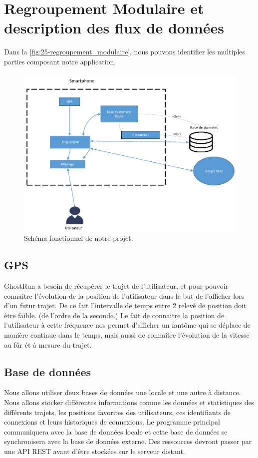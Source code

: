 \chapter{Regroupement Modulaire et description des flux de données}

Dans la \autoref{fig:25-regroupement_modulaire}, nous pouvons identifier les multiples parties composant notre application.

\begin{figure}[h]
    \centering
    \includegraphics[keepaspectratio, width=2\textwidth/2, height=2\textheight/5]{ima/regroupement_modulaire}
    \caption{Schéma fonctionnel de notre projet.}
    \label{fig:25-regroupement_modulaire}
\end{figure}

\section{GPS}
GhostRun a besoin de récupérer le trajet de l'utilisateur, et pour pouvoir connaitre l'évolution de la position de l'utilisateur
dans le but de l'afficher lors d'un futur trajet. De ce fait l'intervalle de temps entre 2 relevé de position doit être faible.
(de l'ordre de la seconde.)
Le fait de connaitre la position de l'utilisateur à cette fréquence nos permet d'afficher un fantôme qui se déplace de manière continue dans le temps,
mais aussi de connaitre l'évolution de la vitesse au fûr ét à mesure du trajet.


\section{Base de données}
Nous allons utiliser deux bases de données une locale et une autre à distance. Nous allons stocker différentes informations comme les données et statistiques des différents trajets, les positions favorites des utilisateurs, ces identifiants de connexions et leurs historiques de connexions.
Le programme principal communiquera avec la base de données locale et cette base de données se synchronisera avec la base de données externe. Des ressources devront passer par une \gls{API} REST avant d’être stockées sur le serveur distant.



